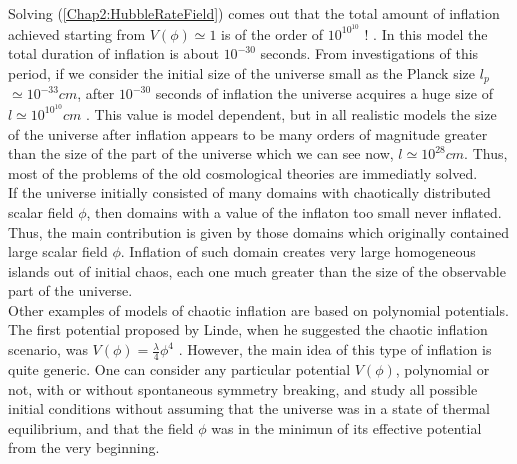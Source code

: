 \documentclass[11pt,a4paper,twoside]{book}
\begin{document}
 Solving (\ref{Chap2:HubbleRateField}) comes out that the total amount of inflation achieved starting from $ V(\phi) \simeq 1 $ is of the order of $ 10^{10^{10}} $ ! . In this model the total duration of inflation is about $ 10^{-30} $ seconds. From investigations of this period, if we consider the initial size of the universe small as the Planck size $ l_{p} $ $\simeq 10^{-33} cm$, after $ 10^{-30} $ seconds of inflation the universe acquires a huge size of $ l \simeq 10^{10^{10}} cm $ \cite{Chap2:Linde_HystoryInflation}. This value is model dependent, but in all realistic models  the size of the universe after inflation appears to be many orders of magnitude greater than the size of the part of the universe which we can see now, $ l \simeq 10^{28} cm $. Thus, most of the problems of the old cosmological theories are immediatly solved. \\
 If the universe initially consisted of many domains with chaotically distributed scalar field $\phi$, then domains with a value of the inflaton too small never inflated. Thus, the main contribution is given by those domains which originally contained large scalar field $\phi$. Inflation of such domain creates very large homogeneous islands out of initial chaos, each one much greater than the size of the observable part of the universe.\\
 Other examples of models of chaotic inflation are based on polynomial potentials. The first potential proposed by Linde, when he suggested the chaotic inflation scenario, was $ V(\phi) = \frac{\lambda}{4} \phi^{4} $ \cite{ChaoticInflationLinde:Chap2}. However, the main idea of this type of inflation is quite generic. One can consider any particular potential $ V(\phi) $, polynomial or not, with or without spontaneous symmetry breaking, and study all possible initial conditions without assuming that the universe was in a state of thermal equilibrium, and that the field $\phi$ was in the minimun of its effective potential from the very beginning.
 
\end{document}
